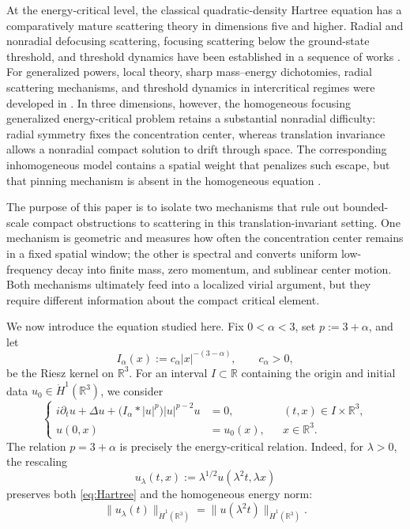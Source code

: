 \documentclass[preprint,12pt]{elsarticle}
\numberwithin{equation}{section}
\theoremstyle{remark}
\newcommand{\R}{\mathbb R}
\begin{document}
At the energy-critical level, the classical quadratic-density Hartree equation has a comparatively mature scattering theory in dimensions five and higher.  Radial and nonradial defocusing scattering, focusing scattering below the ground-state threshold, and threshold dynamics have been established in a sequence of works \cite{MiaoXuZhao2007,MiaoXuZhao2011,MiaoXuZhao2009,LiMiaoZhang2009,MiaoWuXu2015}.  For generalized powers, local theory, sharp mass--energy dichotomies, radial scattering mechanisms, and threshold dynamics in intercritical regimes were developed in \cite{Arora2019,AroraRoudenko2020,AroraRoudenko2022,Zhou2025}.  In three dimensions, however, the homogeneous focusing generalized energy-critical problem retains a substantial nonradial difficulty: radial symmetry fixes the concentration center, whereas translation invariance allows a nonradial compact solution to drift through space.  The corresponding inhomogeneous model contains a spatial weight that penalizes such escape, but that pinning mechanism is absent in the homogeneous equation \cite{GuzmanXu2023}.

The purpose of this paper is to isolate two mechanisms that rule out bounded-scale compact obstructions to scattering in this translation-invariant setting.  One mechanism is geometric and measures how often the concentration center remains in a fixed spatial window; the other is spectral and converts uniform low-frequency decay into finite mass, zero momentum, and sublinear center motion.  Both mechanisms ultimately feed into a localized virial argument, but they require different information about the compact critical element.

We now introduce the equation studied here.  Fix $0<\alpha<3$, set $p:=3+\alpha$, and let
\begin{equation*}
  I_\alpha(x):=c_\alpha|x|^{-(3-\alpha)},
  \qquad c_\alpha>0,
\end{equation*}
be the Riesz kernel on $\R^3$.  For an interval $I\subset\R$ containing the origin and initial data $u_0\in\dot H^1(\R^3)$, we consider
\begin{equation}\label{eq:Hartree}
  \left\{
  \begin{aligned}
  i\partial_tu+\Delta u+\bigl(I_\alpha*|u|^p\bigr)|u|^{p-2}u&=0,
  &&(t,x)\in I\times\R^3,\\
  u(0,x)&=u_0(x),
  &&x\in\R^3.
  \end{aligned}
  \right.
\end{equation}
The relation $p=3+\alpha$ is precisely the energy-critical relation.  Indeed, for $\lambda>0$, the rescaling
\[
  u_\lambda(t,x):=\lambda^{1/2}u(\lambda^2t,\lambda x)
\]
preserves both \eqref{eq:Hartree} and the homogeneous energy norm:
\[
  \|u_\lambda(t)\|_{\dot H^1(\R^3)}
  =\|u(\lambda^2t)\|_{\dot H^1(\R^3)}.
\]
\end{document}
